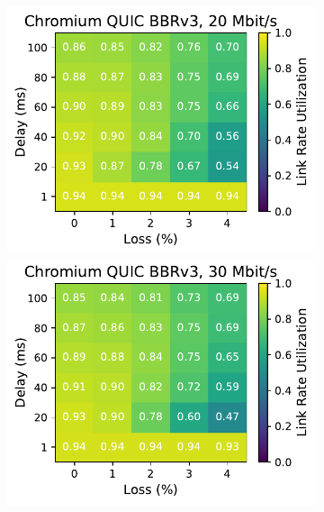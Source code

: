 \begin{figure}[ht]
\begin{subfigure}[b]{0.22\linewidth}
        \includegraphics[width=\linewidth,trim={0 0 2cm 0},clip]{splitting/figures/heatmaps/heatmap_quic_bbr3_20mbps.pdf}
        \includegraphics[width=\linewidth,trim={0 0 2cm 0},clip]{splitting/figures/heatmaps/heatmap_quic_bbr3_30mbps.pdf}

\end{subfigure}
\end{figure}

